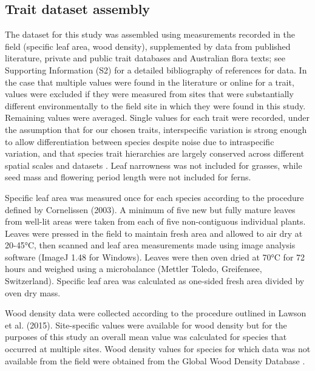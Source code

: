 \documentclass[openright,12pt,a4paper]{memoir}
\begin{document}
\subsection{Trait dataset assembly}
The dataset for this study was assembled using measurements recorded in the field (specific leaf area, wood density), supplemented by data from published literature, private and public trait databases and Australian flora texts; see Supporting Information (S2) for a detailed bibliography of references for data. In the case that multiple values were found in the literature or online for a trait, values were excluded if they were measured from sites that were substantially different environmentally to the field site in which they were found in this study.  Remaining values were averaged. Single values for each trait were recorded, under the assumption that for our chosen traits, interspecific variation is strong enough to allow differentiation between species despite noise due to intraspecific variation, and that species trait hierarchies are largely conserved across different spatial scales and datasets \cite{Cordlandwehr2013, Kazakou2014}. Leaf narrowness was not included for grasses, while seed mass and flowering period length were not included for ferns.

Specific leaf area was measured once for each species according to the procedure defined by Cornelissen (2003). A minimum of five new but fully mature leaves from well-lit areas were taken from each of five non-contiguous individual plants. Leaves were pressed in the field to maintain fresh area and allowed to air dry at 20-45°C, then scanned and leaf area measurements made using image analysis software (ImageJ 1.48 for Windows).  Leaves were then oven dried at 70°C for 72 hours and weighed using a microbalance (Mettler Toledo, Greifensee, Switzerland). Specific leaf area was calculated as one-sided fresh area divided by oven dry mass.

Wood density data were collected according to the procedure outlined in Lawson et al. (2015). Site-specific values were available for wood density but for the purposes of this study an overall mean value was calculated for species that occurred at multiple sites. Wood density values for species for which data was not available from the field were obtained from the Global Wood Density Database \cite{Chave2009}.
\end{document}
